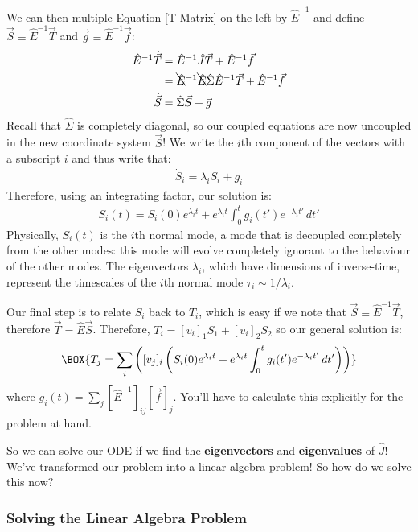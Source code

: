We can then multiple Equation \ref{T Matrix} on the left by $\hat{E}^{-1}$ and define $\vec{S}\equiv\hat{E}^{-1}\vec{T}$ and $\vec{g}\equiv\hat{E}^{-1}\vec{f}$:
\begin{align*}
    \hat{E}^{-1}\dot{\vec{T}}
    &=
    \hat{E}^{-1}\hat{J}\vec{T}+\hat{E}^{-1}\vec{f}\\
    &=\bcancel{\hat{E}}^{-1}\bcancel{\hat{E}}\hat{\Sigma}\hat{E}^{-1}\vec{T}+\hat{E}^{-1}\vec{f}\\
    \dot{\vec{S}}&=\hat{\Sigma}\vec{S}+\vec{g}
\end{align*}
Recall that $\hat{\Sigma}$ is completely diagonal, so our coupled equations are now uncoupled in the new coordinate system $\vec{S}$! We write the $i$th component of the vectors with a subscript $i$ and thus write that:
\begin{align*}
    \dot{S}_i=\lambda_i S_i + g_i
\end{align*}
Therefore, using an integrating factor, our solution is:
\begin{align*}
    \label{Dym System Gen Sol}
    S_i(t)=S_i(0)e^{\lambda_i t}+e^{\lambda_i t}\int_{0}^{t}g_i(t')e^{-\lambda_i t'}\,dt'
\end{align*}
Physically, $S_i(t)$ is the $i$th normal mode, a mode that is decoupled completely from the other modes: this mode will evolve completely ignorant to the behaviour of the other modes. The eigenvectors $\lambda_i$, which have dimensions of inverse-time, represent the timescales of the $i$th normal mode $\tau_i\sim 1/\lambda_i$.

Our final step is to relate $S_i$ back to $T_i$, which is easy if we note that $\vec{S}\equiv\hat{E}^{-1}\vec{T}$, therefore $\vec{T}=\hat{E}\vec{S}$. Therefore, $T_i=[v_i]_1S_1+[v_i]_2S_2$ so our general solution is:
\begin{align}
    \BOX{
        T_j=\sum_{i} \left( [v_j]_i \left( S_i(0)e^{\lambda_i t}+e^{\lambda_i t}\int_{0}^{t}g_i(t')e^{-\lambda_i t'}\,dt' \right) \right)
    }
\end{align}
where $g_i(t)=\sum_{j}[\hat{E}^{-1}]_{ij}[\vec{f}]_j$. You'll have to calculate this explicitly for the problem at hand.

So we can solve our ODE if we find the \textbf{eigenvectors} and \textbf{eigenvalues} of $\hat{J}$! We've transformed our problem into a linear algebra problem! So how do we solve this now?

\subsubsection{Solving the Linear Algebra Problem}

